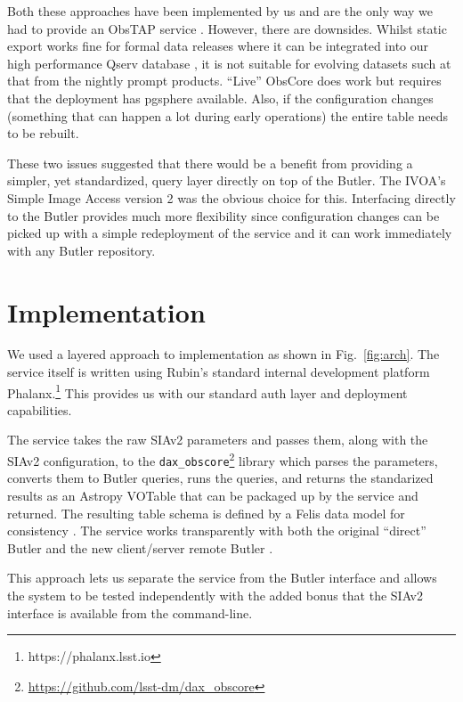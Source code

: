\documentclass[11pt,twoside]{article}
\begin{document}
Both these approaches have been implemented by us and are the only way we had to provide an ObsTAP service \citep{2017ivoa.spec.0509L}.
However, there are downsides.
Whilst static export works fine for formal data releases where it can be integrated into our high performance Qserv database \cite{C15_adassxxxii}, it is not suitable for evolving datasets such at that from the nightly prompt products.
``Live'' ObsCore does work but requires that the deployment has pgsphere available.
Also, if the configuration changes (something that can happen a lot during early operations) the entire table needs to be rebuilt.

These two issues suggested that there would be a benefit from providing a simpler, yet standardized, query layer directly on top of the Butler.
The IVOA's Simple Image Access version 2 \citep[SIAv2;][]{2015ivoa.spec.1223D} was the obvious choice for this.
Interfacing directly to the Butler provides much more flexibility since configuration changes can be picked up with a simple redeployment of the service and it can work immediately with any Butler repository.

\section{Implementation}


We used a layered approach to implementation as shown in Fig.\ \ref{fig:arch}.
The service itself \citep{SQR-095} is written using Rubin's standard internal development platform Phalanx.\footnote{https://phalanx.lsst.io}
This provides us with our standard auth layer and deployment capabilities.

The service takes the raw SIAv2 parameters and passes them, along with the SIAv2 configuration, to the \texttt{dax\_obscore}\footnote{\url{https://github.com/lsst-dm/dax_obscore}} library which parses the parameters, converts them to Butler queries, runs the queries, and returns the standarized results as an Astropy VOTable that can be packaged up by the service and returned.
The resulting table schema is defined by a Felis data model for consistency \citep{C702_adassxxxiv}.
The service works transparently with both the original ``direct'' Butler and the new client/server remote Butler \citep{2024SPIE13101E..3GJ}.

This approach lets us separate the service from the Butler interface and allows the system to be tested independently with the added bonus that the SIAv2 interface is available from the command-line.
\end{document}
